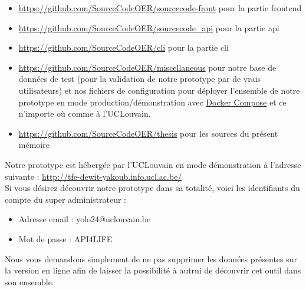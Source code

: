 \begin{itemize}
    \item \href{https://github.com/SourceCodeOER/sourcecode-front}{https://github.com/SourceCodeOER/sourcecode-front} pour la partie \gls{frontend}
    \item \href{https://github.com/SourceCodeOER/sourcecode\_api}{https://github.com/SourceCodeOER/sourcecode\_api} pour la partie \Gls{api}
    \item \href{https://github.com/SourceCodeOER/cli}{https://github.com/SourceCodeOER/cli} pour la partie \Gls{cli}
    \item \href{https://github.com/SourceCodeOER/miscellaneous}{https://github.com/SourceCodeOER/miscellaneous} pour notre base de données de test (pour la validation de notre prototype par de vrais utilisateurs) et nos fichiers de configuration pour déployer l'ensemble de notre prototype en mode production/démonstration avec \href{https://docs.docker.com/compose/}{Docker Compose} et ce n'importe où comme à l'UCLouvain.
    \item \href{https://github.com/SourceCodeOER/thesis}{https://github.com/SourceCodeOER/thesis} pour les sources du présent mémoire
\end{itemize}

Notre prototype est hébergée par l'UCLouvain en mode démonstration à l'adresse suivante : \href{http://tfe-dewit-yakoub.info.ucl.ac.be/}{http://tfe-dewit-yakoub.info.ucl.ac.be/} \\

Si vous désirez découvrir notre prototype dans sa totalité, voici les identifiants du compte du super administrateur : 
\begin{itemize}
    \item Adresse email : yolo24@uclouvain.be
    \item Mot de passe : API4LIFE
\end{itemize}
Nous vous demandons simplement de ne pas supprimer les données présentes sur la version en ligne afin de laisser la possibilité à autrui de découvrir cet outil dans son ensemble.
\fi